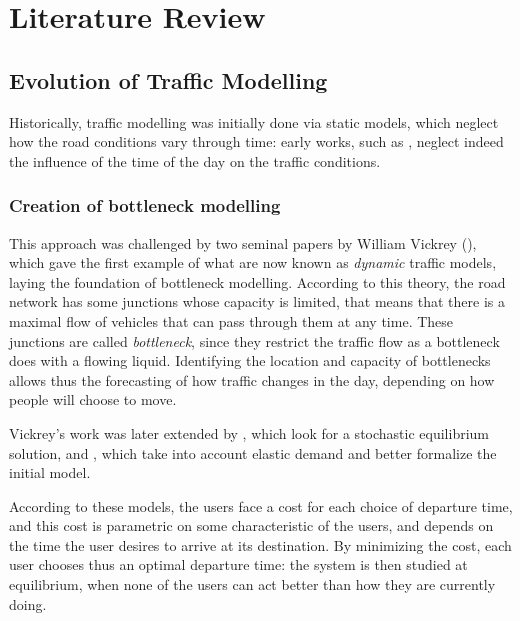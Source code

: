 
\chapter{Literature Review}
\label{chap:lit_rev}




\section{Evolution of Traffic Modelling}
\label{sec:hist}

Historically, traffic modelling was initially done via static models,
which neglect how the road conditions vary through time:
early works, such as \textcite{Jorgensen1947},
neglect indeed the influence of the time of the day on the traffic conditions.

\subsection{Creation of bottleneck modelling}

This approach was challenged by two seminal papers by William Vickrey (\cite{f32d6720-dd02-34b7-a4ba-c4c21193efe7, 4ffb5da1-1f49-3898-98a7-209781744dc0}),
which gave the first example of what are now known as \textit{dynamic} traffic models,
laying the foundation of bottleneck modelling.
According to this theory, the road network has some junctions whose capacity is limited,
that means that there is a maximal flow of vehicles that can pass through them at any time.
These junctions are called \textit{bottleneck}, since they restrict the traffic flow as a bottleneck does with a flowing liquid.
Identifying the location and capacity of bottlenecks allows thus the forecasting of how traffic changes in the day,
depending on how people will choose to move.

Vickrey's work was later extended by \textcite{de1983stochastic}, which look for a stochastic equilibrium solution, and \textcite{d0907f84-e14a-3d98-ad20-759f41491d6e}, which take into account elastic demand and better formalize the initial model.

According to these models, the users face a cost for each choice of departure time,
and this cost is parametric on some characteristic of the users,
and depends on the time the user desires to arrive at its destination.
By minimizing the cost, each user chooses thus an optimal departure time:
the system is then studied at equilibrium, when none of the users can act better than how they are currently doing.

